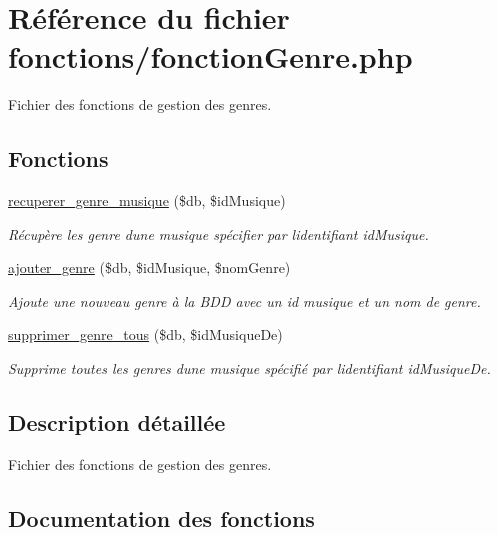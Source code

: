 \hypertarget{fonctionGenre_8php}{}\section{Référence du fichier fonctions/fonction\+Genre.php}
\label{fonctionGenre_8php}


Fichier des fonctions de gestion des genres.  


\subsection*{Fonctions}
\begin{DoxyCompactItemize}
\item 
\hyperlink{fonctionGenre_8php_ae3ebadf36a99328177028d1824d9a1fb}{recuperer\+\_\+genre\+\_\+musique} (\$db, \$id\+Musique)
\begin{DoxyCompactList}\small\item\em Récupère les genre d\textquotesingle{}une musique spécifier par l\textquotesingle{}identifiant \textquotesingle{}id\+Musique\textquotesingle{}. \end{DoxyCompactList}\item 
\hyperlink{fonctionGenre_8php_ab658dc12789ce97c80b529b97f425905}{ajouter\+\_\+genre} (\$db, \$id\+Musique, \$nom\+Genre)
\begin{DoxyCompactList}\small\item\em Ajoute une nouveau genre à la B\+DD avec un id musique et un nom de genre. \end{DoxyCompactList}\item 
\hyperlink{fonctionGenre_8php_aac30608e1fb36a083cc805b80a8f1fa0}{supprimer\+\_\+genre\+\_\+tous} (\$db, \$id\+Musique\+De)
\begin{DoxyCompactList}\small\item\em Supprime toutes les genres d\textquotesingle{}une musique spécifié par l\textquotesingle{}identifiant \textquotesingle{}id\+Musique\+De\textquotesingle{}. \end{DoxyCompactList}\end{DoxyCompactItemize}


\subsection{Description détaillée}
Fichier des fonctions de gestion des genres. 



\subsection{Documentation des fonctions}
\mbox{\label{fonctionGenre_8php_ab658dc12789ce97c80b529b97f425905}} 
